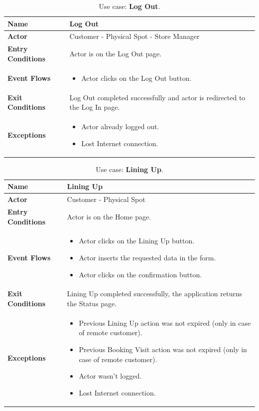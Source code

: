 \begin{table}[H]
\centering
\begin{tabular}{| m{} | m{} |} 
	\hline
	\textbf{Name} & Log Out \\ 
	\hline
	\textbf{Actor} & Customer - Physical Spot - Store Manager \\ 
	\hline
	\textbf{Entry Conditions} & Actor is on the Log Out page. \\ 
	\hline
	\textbf{Event Flows} &
	\begin{itemize}
	\item Actor clicks on the Log Out button.
	\end{itemize} \\ 
	\hline
	\textbf{Exit Conditions} & Log Out completed successfully and actor is redirected to the Log In page. \\ 
	\hline
	\textbf{Exceptions} &
	\begin{itemize}
	\item Actor already logged out.
	\item Lost Internet connection.
	\end{itemize} \\ 
	\hline
\end{tabular}
\caption{Use case: \textbf{Log Out}.}
\label{tableLogOut}
\end{table}

\begin{table}[H]
\centering
\begin{tabular}{| m{} | m{} |} 
	\hline
	\textbf{Name} & Lining Up \\ 
	\hline
	\textbf{Actor} & Customer - Physical Spot \\ 
	\hline
	\textbf{Entry Conditions} & Actor is on the Home page. \\ 
	\hline
	\textbf{Event Flows} &
	\begin{itemize}
	\item Actor clicks on the Lining Up button.
	\item Actor inserts the requested data in the form.
	\item Actor clicks on the confirmation button.
	\end{itemize} \\ 
	\hline
	\textbf{Exit Conditions} & Lining Up completed successfully, the application returns the Status page. \\ 
	\hline
	\textbf{Exceptions} &
	\begin{itemize}
	\item Previous Lining Up action was not expired (only in case of remote customer).
	\item Previous Booking Visit action was not expired (only in case of remote customer).
	\item Actor wasn't logged.
	\item Lost Internet connection.
	\end{itemize} \\ 
	\hline
\end{tabular}
\caption{Use case: \textbf{Lining Up}.}
\label{tableLiningUp}
\end{table}

